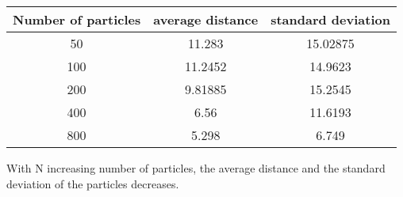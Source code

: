 \documentclass[10pt,a4paper]{article}
\begin{document}
  \begin{tabular}{c|c|c}
Number of particles & average distance&  standard deviation\\
\hline \hline
50 & 11.283 & 15.02875  \\
100 & 11.2452 & 14.9623  \\
200 & 9.81885 & 15.2545  \\
400 & 6.56 & 11.6193 \\
800 & 5.298 & 6.749 \\
\end{tabular}

With N increasing number of particles, the average distance and the standard deviation of the particles decreases.  
 
  
\end{document}
